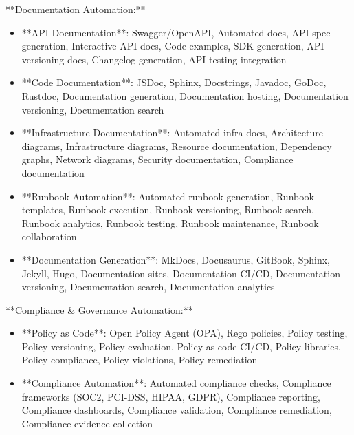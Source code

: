 \documentclass[11pt,a4paper]{article}
\begin{document}
**Documentation Automation:**

\begin{itemize}
\item **API Documentation**: Swagger/OpenAPI, Automated docs, API spec generation, Interactive API docs, Code examples, SDK generation, API versioning docs, Changelog generation, API testing integration
\end{itemize}

\begin{itemize}
\item **Code Documentation**: JSDoc, Sphinx, Docstrings, Javadoc, GoDoc, Rustdoc, Documentation generation, Documentation hosting, Documentation versioning, Documentation search
\end{itemize}

\begin{itemize}
\item **Infrastructure Documentation**: Automated infra docs, Architecture diagrams, Infrastructure diagrams, Resource documentation, Dependency graphs, Network diagrams, Security documentation, Compliance documentation
\end{itemize}

\begin{itemize}
\item **Runbook Automation**: Automated runbook generation, Runbook templates, Runbook execution, Runbook versioning, Runbook search, Runbook analytics, Runbook testing, Runbook maintenance, Runbook collaboration
\end{itemize}

\begin{itemize}
\item **Documentation Generation**: MkDocs, Docusaurus, GitBook, Sphinx, Jekyll, Hugo, Documentation sites, Documentation CI/CD, Documentation versioning, Documentation search, Documentation analytics
\end{itemize}

**Compliance \& Governance Automation:**

\begin{itemize}
\item **Policy as Code**: Open Policy Agent (OPA), Rego policies, Policy testing, Policy versioning, Policy evaluation, Policy as code CI/CD, Policy libraries, Policy compliance, Policy violations, Policy remediation
\end{itemize}

\begin{itemize}
\item **Compliance Automation**: Automated compliance checks, Compliance frameworks (SOC2, PCI-DSS, HIPAA, GDPR), Compliance reporting, Compliance dashboards, Compliance validation, Compliance remediation, Compliance evidence collection
\end{itemize}
\end{document}
